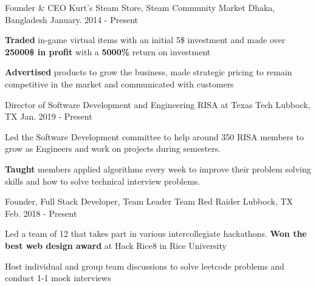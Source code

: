 
\begin{cventries}

    \cventry
    {Founder \& CEO} %
    {Kurt's Steam Store, Steam Community Market} %
    {Dhaka, Bangladesh} %
    {January. 2014 -  Present} %
    {
      \begin{cvitems} %
        \item { \textbf{Traded} in-game virtual items with an initial 5\$ investment and made over \textbf{25000\$ in profit} with a \textbf{5000\% } return on investment }
        \item { \textbf{Advertised} products to grow the business, made strategic pricing to remain competitive in the market and communicated with customers}
      \end{cvitems}
    }

    \cventry
    {Director of Software Development and Engineering} %
    {RISA at Texas Tech} %
    {Lubbock, TX} %
    {Jan. 2019 - Present} %
    {
      \begin{cvitems} %
        \item {Led the Software Development committee to help around 350 RISA members to grow as Engineers and work on projects during semesters. }
        \item { \textbf{Taught} members applied algorithms every week to improve their problem solving skills and how to solve technical interview problems. }
      \end{cvitems}
    }
    
    \cventry
    {Founder, Full Stack Developer, Team Leader} %
    {Team Red Raider} %
    {Lubbock, TX} %
    {Feb. 2018 - Present} %
    {
      \begin{cvitems} %
        \item {Led a team of 12 that takes part in various intercollegiate hackathons. \textbf{Won the best web design award} at Hack Rice8 in Rice University}
        \item {Host individual and group team discussions to solve leetcode problems and conduct 1-1 mock interviews }
      \end{cvitems}
    }
    
\end{cventries}
